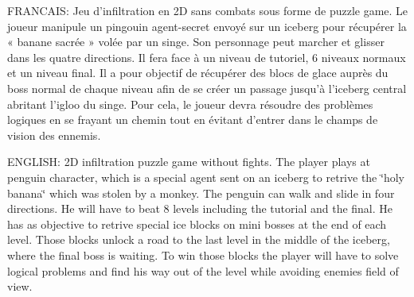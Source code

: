 F\+R\+A\+N\+C\+A\+I\+S\+: Jeu d’infiltration en 2\+D sans combats sous forme de puzzle game. Le joueur manipule un pingouin agent-\/secret envoyé sur un iceberg pour récupérer la « banane sacrée » volée par un singe. Son personnage peut marcher et glisser dans les quatre directions. Il fera face à un niveau de tutoriel, 6 niveaux normaux et un niveau final. Il a pour objectif de récupérer des blocs de glace auprès du boss normal de chaque niveau afin de se créer un passage jusqu’à l’iceberg central abritant l’igloo du singe. Pour cela, le joueur devra résoudre des problèmes logiques en se frayant un chemin tout en évitant d’entrer dans le champs de vision des ennemis.

E\+N\+G\+L\+I\+S\+H\+: 2\+D infiltration puzzle game without fights. The player plays at penguin character, which is a special agent sent on an iceberg to retrive the \char`\"{}holy banana\char`\"{} which was stolen by a monkey. The penguin can walk and slide in four directions. He will have to beat 8 levels including the tutorial and the final. He has as objective to retrive special ice blocks on mini bosses at the end of each level. Those blocks unlock a road to the last level in the middle of the iceberg, where the final boss is waiting. To win those blocks the player will have to solve logical problems and find his way out of the level while avoiding enemies\textquotesingle{} field of view. 

~\newline
 